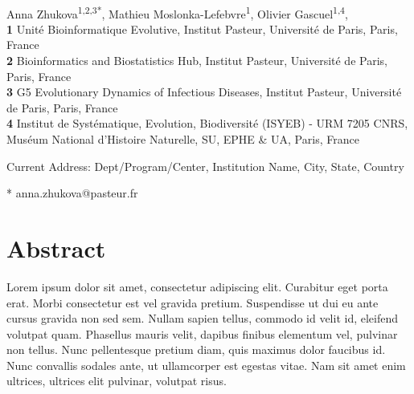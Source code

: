 \documentclass[10pt,letterpaper]{article}
\begin{document}
\vspace*{0.2in}

\begin{flushleft}
{\Large
\textbf{} %
}
\newline
\\
Anna Zhukova\textsuperscript{1,2,3*},
Mathieu Moslonka-Lefebvre\textsuperscript{1\textcurrency},
Olivier Gascuel\textsuperscript{1,4},
\\
\bigskip
\textbf{1} Unit\'e Bioinformatique Evolutive, Institut Pasteur, Université de Paris, Paris, France
\\
\textbf{2} Bioinformatics and Biostatistics Hub, Institut Pasteur, Université de Paris, Paris, France
\\
\textbf{3} G5 Evolutionary Dynamics of Infectious Diseases, Institut Pasteur, Université de Paris, Paris, France
\\
\textbf{4} Institut de Syst\'{e}matique, Evolution, Biodiversit\'{e} (ISYEB) - URM 7205 CNRS, Mus\'{e}um National d'Histoire Naturelle, SU, EPHE \& UA, Paris, France
\\
\bigskip

\textcurrency Current Address: Dept/Program/Center, Institution Name, City, State, Country %


* anna.zhukova@pasteur.fr

\end{flushleft}
\section*{Abstract}
Lorem ipsum dolor sit amet, consectetur adipiscing elit. Curabitur eget porta erat. Morbi consectetur est vel gravida pretium. Suspendisse ut dui eu ante cursus gravida non sed sem. Nullam sapien tellus, commodo id velit id, eleifend volutpat quam. Phasellus mauris velit, dapibus finibus elementum vel, pulvinar non tellus. Nunc pellentesque pretium diam, quis maximus dolor faucibus id. Nunc convallis sodales ante, ut ullamcorper est egestas vitae. Nam sit amet enim ultrices, ultrices elit pulvinar, volutpat risus.
\end{document}
